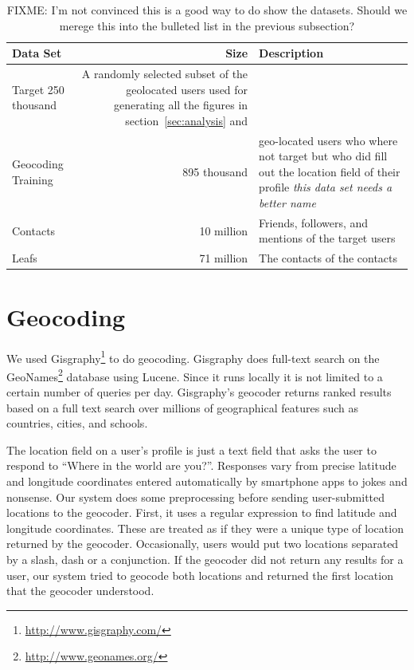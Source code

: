 \begin{table}[tbh]
\centering
\begin{tabular}{l r l}
    Data Set & Size & Description \\
    \hline
    Target 250 thousand & A randomly selected subset of
    the geolocated users used for generating all the figures in
    section~\ref{sec:analysis} and   \\
    Geocoding Training & 895 thousand & geo-located users who where not
    target but who did fill out the location field of their profile
    \emph{this data set needs a better name}\\
    Contacts & 10 million & Friends, followers, and mentions of the target
    users \\
    Leafs & 71 million & The contacts of the contacts \\
\end{tabular}
\label{tab:DataTypes}
\caption{FIXME: I'm not convinced this is a good way to do show the datasets. Should we merege this into the bulleted list in the previous subsection?}
\end{table}

\section{Geocoding}
We used Gisgraphy\footnote{\url{http://www.gisgraphy.com/}} to do geocoding.
%
Gisgraphy does full-text search on the
GeoNames\footnote{\url{http://www.geonames.org/}} database using Lucene.
%
Since it runs locally it is not limited to a certain number of queries per day.
%
Gisgraphy's geocoder returns ranked results based on a full text search
over millions of geographical features such as countries, cities, and schools.

The location field on a user's profile is just a text field that asks the user
to respond to ``Where in the world are you?''.
%
Responses vary from precise latitude and longitude coordinates entered
automatically by smartphone apps to jokes and nonsense.
Our system does some preprocessing before sending user-submitted locations to
the geocoder.
First, it uses a regular expression to find latitude and longitude coordinates.
These are treated as if they were a unique type of location returned by the
geocoder.
Occasionally, users would put two locations separated by a slash, dash or a
conjunction.
If the geocoder did not return any results for a user, our system tried to
geocode both locations and returned the first location that the geocoder
understood.

